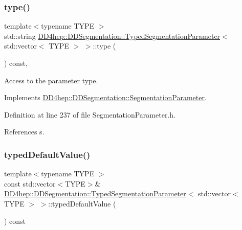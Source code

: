 \subsubsection{\texorpdfstring{type()}{type()}}
{\footnotesize\ttfamily template$<$typename T\+Y\+PE $>$ \\
std\+::string \hyperlink{class_d_d4hep_1_1_d_d_segmentation_1_1_typed_segmentation_parameter}{D\+D4hep\+::\+D\+D\+Segmentation\+::\+Typed\+Segmentation\+Parameter}$<$ std\+::vector$<$ T\+Y\+PE $>$ $>$\+::type (\begin{DoxyParamCaption}{ }\end{DoxyParamCaption}) const\hspace{0.3cm}{\ttfamily [inline]}, {\ttfamily [virtual]}}



Access to the parameter type. 



Implements \hyperlink{class_d_d4hep_1_1_d_d_segmentation_1_1_segmentation_parameter_a761f142a3d6d7ecdbc200e97913af165}{D\+D4hep\+::\+D\+D\+Segmentation\+::\+Segmentation\+Parameter}.



Definition at line 237 of file Segmentation\+Parameter.\+h.



References s.

\hypertarget{class_d_d4hep_1_1_d_d_segmentation_1_1_typed_segmentation_parameter_3_01std_1_1vector_3_01_t_y_p_e_01_4_01_4_ad596757ec5212f42cbca088eb0f570c9}{}\label{class_d_d4hep_1_1_d_d_segmentation_1_1_typed_segmentation_parameter_3_01std_1_1vector_3_01_t_y_p_e_01_4_01_4_ad596757ec5212f42cbca088eb0f570c9} 
\subsubsection{\texorpdfstring{typed\+Default\+Value()}{typedDefaultValue()}}
{\footnotesize\ttfamily template$<$typename T\+Y\+PE $>$ \\
const std\+::vector$<$T\+Y\+PE$>$\& \hyperlink{class_d_d4hep_1_1_d_d_segmentation_1_1_typed_segmentation_parameter}{D\+D4hep\+::\+D\+D\+Segmentation\+::\+Typed\+Segmentation\+Parameter}$<$ std\+::vector$<$ T\+Y\+PE $>$ $>$\+::typed\+Default\+Value (\begin{DoxyParamCaption}{ }\end{DoxyParamCaption}) const\hspace{0.3cm}{\ttfamily [inline]}}



